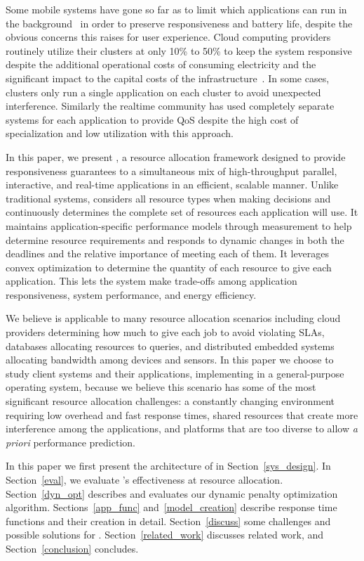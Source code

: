 Some mobile systems have gone so far as to limit which applications can run in the background~\cite{iOsDev} in order to preserve responsiveness and battery life, despite the obvious concerns this raises for user experience.  Cloud computing providers routinely utilize their clusters at only 10\% to 50\% to keep the system responsive despite the additional operational costs of consuming electricity and the significant impact to the capital costs of the infrastructure~\cite{Barroso2009,Hennessy2011}.   In some cases, clusters only run a single application on each cluster to avoid unexpected interference.  Similarly the realtime community has used completely separate systems for each application to provide QoS despite the high cost of specialization and low utilization with this approach.

In this paper, we present \pacora, a resource allocation framework designed to provide responsiveness guarantees to a simultaneous mix of high-throughput parallel, interactive, and real-time applications in an efficient, scalable manner.  Unlike traditional systems, \pacora considers all resource types when making decisions and continuously determines the complete set of resources each application will use.   It maintains application-specific performance models through measurement to help determine resource requirements and responds to dynamic changes in both the deadlines and the relative importance of meeting each of them. It leverages convex optimization to determine the quantity of each resource to give each application. This lets the system make trade-offs among application responsiveness, system performance, and energy efficiency.

We believe \pacora is applicable to many resource allocation scenarios including cloud providers determining how much to give each job to avoid violating SLAs, databases allocating resources to queries, and distributed embedded systems allocating bandwidth among devices and sensors.  In this paper we choose to study client systems and their applications, implementing \pacora in a general-purpose operating system, because we believe this scenario has some of the most significant resource allocation challenges: a constantly changing environment requiring low overhead and fast response times, shared resources that create more interference among the applications, and platforms that are too diverse to allow \emph{a priori} performance prediction.


In this paper we first present the architecture of \pacora in Section~\ref{sys_design}.  In Section~\ref{eval}, we evaluate \pacora's effectiveness at resource allocation. Section~\ref{dyn_opt} describes and evaluates our dynamic penalty optimization algorithm. Sections~\ref{app_func} and~\ref{model_creation} describe response time functions and their creation in detail.  Section~\ref{discuss} some challenges and possible solutions for \pacora. Section~\ref{related_work} discusses related work, and Section~\ref{conclusion} concludes.
